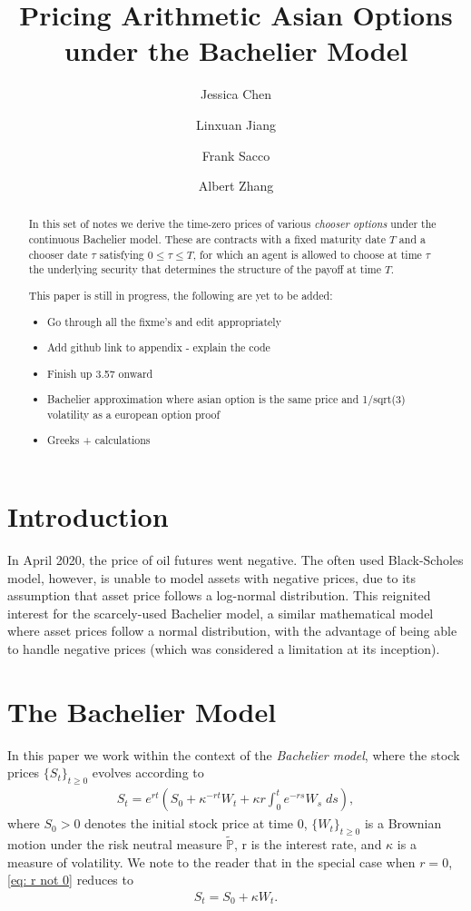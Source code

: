 \documentclass[reqno]{amsart}
\title{Pricing Arithmetic Asian Options under the Bachelier Model} %
\author{Jessica Chen}
\author{Linxuan Jiang}
\author{Frank Sacco}
\author{Albert Zhang}
\begin{document}
\begin{abstract}
     In this set of notes we derive the time-zero prices of various \emph{chooser options} under the continuous Bachelier model.
     These are contracts with a fixed maturity date $T$ and a chooser date $\tau$ satisfying $0 \le \tau \le T$, for which an agent is allowed to choose at time $\tau$ the underlying security that determines the structure of the payoff at time $T$.  

     This paper is still in progress, the following are yet to be added:
     \begin{itemize}
          \item Go through all the fixme's and edit appropriately
          \item Add github link to appendix - explain the code
          \item Finish up 3.57 onward
          \item Bachelier approximation where asian option is the same price and 1/sqrt(3) volatility as a european option proof
          \item Greeks + calculations
     \end{itemize}
\end{abstract}


\maketitle  
\tableofcontents

\section{Introduction}
In April 2020, the price of oil futures went negative.
The often used Black-Scholes model, however, is unable to model assets with negative prices, due to its assumption that asset price follows a log-normal distribution.
This reignited interest for the scarcely-used Bachelier model, a similar mathematical model where asset prices follow a normal distribution, with the advantage of being able to handle negative prices (which was considered a limitation at its inception).

\section{The Bachelier Model}
In this paper we work within the context of the \emph{Bachelier model}, where the stock prices $\{S_t\}_{t \ge 0}$ evolves according to 
\begin{align}\label{eq: r not 0}
	 S_t = e^{rt} \left( S_0 + \kappa^{-rt}W_t + \kappa r \int_0^t e^{-rs} W_s \; ds \right),
\end{align}
where $S_0 > 0$ denotes the initial stock price at time 0, $\{W_t\}_{t \ge 0}$ is a Brownian motion under the risk neutral measure $\tilde{\mathbb{P}}$, r is the interest rate, and $\kappa$ is a measure of volatility.
We note to the reader that in the special case when $r = 0$, \eqref{eq: r not 0} reduces to 
\begin{align}\label{eq: r=0}
      S_t = S_0 + \kappa W_t. 
\end{align}
\end{document}

